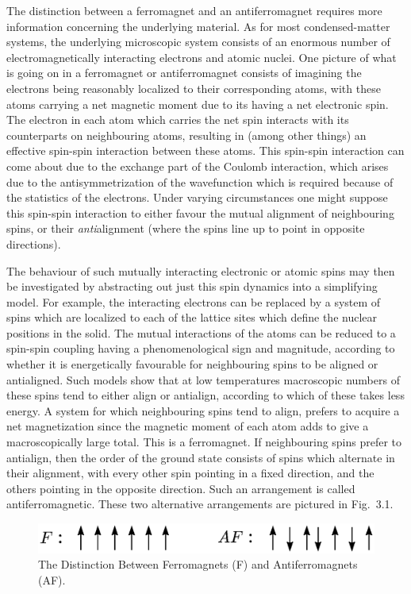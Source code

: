 \documentclass[12pt,epsf]{report}
\begin{document}
The distinction between a ferromagnet and an
antiferromagnet requires more information concerning the
underlying material. As for most condensed-matter systems,
the underlying microscopic system consists of an enormous
number of electromagnetically interacting electrons and
atomic nuclei. One picture of what is going on in a
ferromagnet or antiferromagnet consists of imagining the
electrons being reasonably localized to their corresponding
atoms, with these atoms carrying a net magnetic moment due
to its having a net electronic spin. The electron in each
atom which carries the net spin interacts with its
counterparts on neighbouring atoms, resulting in (among
other things) an effective spin-spin interaction between
these atoms. This spin-spin interaction can come about due
to the exchange part of the Coulomb interaction, which
arises due to the antisymmetrization of the wavefunction
which is required because of the statistics of the
electrons. Under varying circumstances one might suppose
this spin-spin interaction to either favour the mutual
alignment of neighbouring spins, or their {\em
anti}alignment (where the spins line up to point in
opposite directions).

The behaviour of such mutually interacting electronic or
atomic spins may then be investigated by abstracting out
just this spin dynamics into a simplifying model. For
example, the interacting electrons can be replaced by a
system of spins which are localized to each of the lattice
sites which define the nuclear positions in the solid. The
mutual interactions of the atoms can be reduced to a
spin-spin coupling having a phenomenological sign and
magnitude, according to whether it is energetically
favourable for neighbouring spins to be aligned or
antialigned. Such models show that at low temperatures
macroscopic numbers of these spins tend to either align or
antialign, according to which of these takes less energy. A
system for which neighbouring spins tend to align, prefers
to acquire a net magnetization since the magnetic moment of
each atom adds to give a macroscopically large total. This
is a ferromagnet. If neighbouring spins prefer to
antialign, then the order of the ground state consists of
spins which alternate in their alignment, with every other
spin pointing in a fixed direction, and the others pointing
in the opposite direction. Such an arrangement is called
antiferromagnetic. These two alternative arrangements are
pictured in Fig.~3.1.


\begin{figure}
\includegraphics{FvsAF.eps}
\caption{The Distinction Between Ferromagnets (F) and
Antiferromagnets (AF).}
\end{figure}
\end{document}
